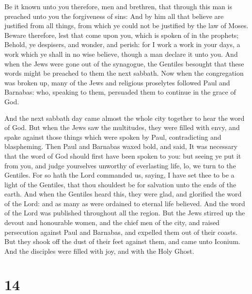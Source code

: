  Be it known unto you therefore, men and brethren, that
through this man is preached unto you the forgiveness of sins:
 And by him all that believe are justified from all things,
from which ye could not be justified by the law of Moses. 
Beware therefore, lest that come upon you, which is spoken of in the
prophets;  Behold, ye despisers, and wonder, and perish:
for I work a work in your days, a work which ye shall in no wise
believe, though a man declare it unto you.  And when the
Jews were gone out of the synagogue, the Gentiles besought that these
words might be preached to them the next sabbath.  Now when
the congregation was broken up, many of the Jews and religious
proselytes followed Paul and Barnabas: who, speaking to them, persuaded
them to continue in the grace of God.

 And the next sabbath day came almost the whole city
together to hear the word of God.  But when the Jews saw
the multitudes, they were filled with envy, and spake against those
things which were spoken by Paul, contradicting and blaspheming.
 Then Paul and Barnabas waxed bold, and said, It was
necessary that the word of God should first have been spoken to you: but
seeing ye put it from you, and judge yourselves unworthy of everlasting
life, lo, we turn to the Gentiles.  For so hath the Lord
commanded us, saying, I have set thee to be a light of the Gentiles,
that thou shouldest be for salvation unto the ends of the earth.
 And when the Gentiles heard this, they were glad, and
glorified the word of the Lord: and as many as were ordained to eternal
life believed.  And the word of the Lord was published
throughout all the region.  But the Jews stirred up the
devout and honourable women, and the chief men of the city, and raised
persecution against Paul and Barnabas, and expelled them out of their
coasts.  But they shook off the dust of their feet against
them, and came unto Iconium.  And the disciples were filled
with joy, and with the Holy Ghost.

\hypertarget{section-13}{%
\section{14}\label{section-13}}

